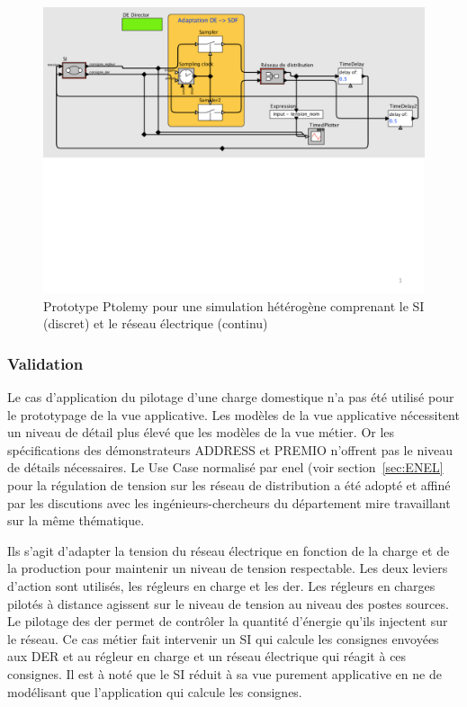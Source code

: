 \begin{figure}[!ht]
 \begin{center}
  \includegraphics[trim = 0cm 8cm 0cm 0cm, width=1\textwidth]{figures/6_methodologie/simu_ptolemy.pdf}
 \end{center}
 \caption{Prototype Ptolemy pour une simulation hétérogène comprenant le SI (discret) et le réseau électrique (continu)}
 \label{fig:simu_ptolemy}
\end{figure}
		
				\subsubsection{Validation}
		Le cas d'application du pilotage d'une charge domestique n'a pas été utilisé pour le prototypage de la vue applicative. Les modèles de la vue applicative nécessitent un niveau de détail plus élevé que les modèles de la vue métier. Or les spécifications des démonstrateurs ADDRESS et PREMIO n'offrent pas le niveau de détails nécessaires. Le Use Case normalisé par \gls{enel} (voir section~\ref{sec:ENEL} pour la régulation de tension sur les réseau de distribution a été adopté et affiné par les discutions avec les ingénieurs-chercheurs du département \gls{mire} travaillant sur la même thématique. 
		
		Ils s'agit d'adapter la tension du réseau électrique en fonction de la charge et de la production pour maintenir un niveau de tension respectable. Les deux leviers d'action sont utilisés, les régleurs en charge et les \gls{der}. Les régleurs en charges pilotés à distance agissent sur le niveau de tension au niveau des postes sources. Le pilotage des \gls{der} permet de contrôler la quantité d'énergie qu'ils injectent sur le réseau. Ce cas métier fait intervenir un SI qui calcule les consignes envoyées aux DER et au régleur en charge et un réseau électrique qui réagit à ces consignes. Il est à noté que le SI réduit à sa vue purement applicative en ne de modélisant que l'application qui calcule les consignes.
		
